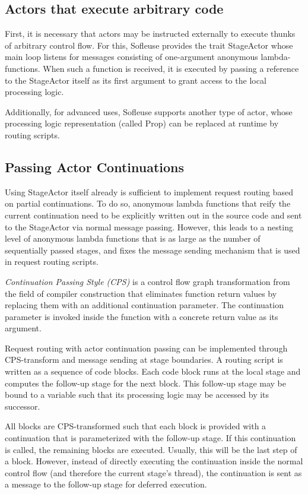 \documentclass{sig-alternate}
\begin{document}
\subsection{Actors that execute arbitrary code} 

First, it is necessary that actors may be instructed externally to execute thunks of arbitrary
control flow. For this, Sofleuse provides the trait StageActor whose main loop listens for messages
consisting of one-argument anonymous lambda-functions. When such a function is received, it is
executed by passing a reference to the StageActor itself as its first argument to grant access to 
the local processing logic.

Additionally, for advanced uses, Sofleuse supports another type of actor, whose processing logic
representation (called Prop) can be replaced at runtime by routing scripts.


\subsection{Passing Actor Continuations}

Using StageActor itself already is sufficient to implement request routing based on partial
continuations. To do so, anonymous lambda functions that reify the current continuation need to be
explicitly written out in the source code and sent to the StageActor via normal message passing.
However, this leads to a nesting level of anonymous lambda functions that is as large as the number
of sequentially passed stages, and fixes the message sending mechanism that is used in request
routing scripts.

\emph{Continuation Passing Style (CPS)} is a control flow graph transformation from the field of
compiler construction that eliminates function return values by replacing them with an additional
continuation parameter. The continuation parameter is invoked inside the function with a
concrete return value as its argument.

Request routing with actor continuation passing can be implemented through CPS-transform and
message sending at stage boundaries.  A routing script is written as a sequence of code blocks.
Each code block runs at the local stage and computes the follow-up stage for the next block.
This follow-up stage may be bound to a variable such that its processing logic may be accessed
by its successor.

All blocks are CPS-transformed such that each block is provided with a continuation that is
parameterized with the follow-up stage. If this continuation is called, the remaining blocks are
executed. Usually, this will be the last step of a block. However, instead of directly executing the
continuation inside the normal control flow (and therefore the current stage's thread), the 
continuation is sent as a message to the follow-up stage for deferred execution.
\end{document}

